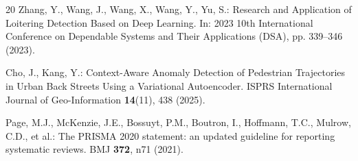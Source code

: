 \documentclass[runningheads]{llncs}
\begin{document}
\begin{thebibliography}{20}
Zhang, Y., Wang, J., Wang, X., Wang, Y., Yu, S.: Research and Application of Loitering Detection Based on Deep Learning. In: 2023 10th International Conference on Dependable Systems and Their Applications (DSA), pp. 339--346 (2023). 

Cho, J., Kang, Y.: Context-Aware Anomaly Detection of Pedestrian Trajectories in Urban Back Streets Using a Variational Autoencoder. ISPRS International Journal of Geo-Information \textbf{14}(11), 438 (2025). 

Page, M.J., McKenzie, J.E., Bossuyt, P.M., Boutron, I., Hoffmann, T.C., Mulrow, C.D., et al.: The PRISMA 2020 statement: an updated guideline for reporting systematic reviews. BMJ \textbf{372}, n71 (2021). 

\end{thebibliography}
\end{document}
